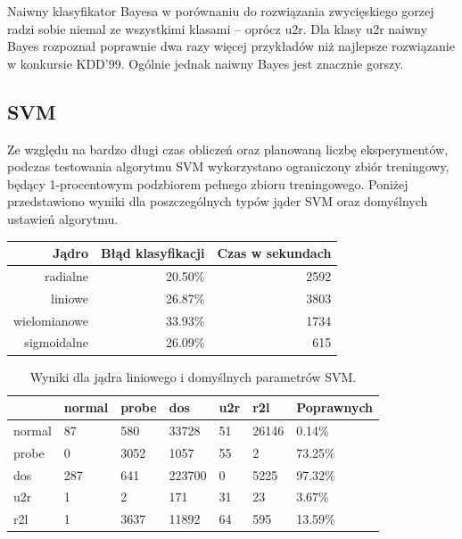 \documentclass[a4paper, 12pt]{article}
\begin{document}
Naiwny klasyfikator Bayesa w porównaniu do rozwiązania zwycięskiego gorzej radzi sobie
niemal ze wszystkimi klasami -- oprócz u2r. Dla klasy u2r naiwny Bayes rozpoznał poprawnie
dwa razy więcej przykładów niż najlepsze rozwiązanie w konkursie KDD'99. 
Ogólnie jednak naiwny Bayes jest znacznie gorszy.

\subsection{SVM}

Ze względu na bardzo długi czas obliczeń oraz planowaną liczbę eksperymentów, podczas testowania algorytmu SVM wykorzystano ograniczony zbiór treningowy, będący 1-procentowym
podzbiorem pełnego zbioru treningowego. Poniżej przedstawiono wyniki dla poszczególnych typów jąder SVM oraz domyślnych ustawień algorytmu.

\begin{table}[H]
\centering
\begin{tabular}{ | r | r | r | } \hline
Jądro & Błąd klasyfikacji & Czas w sekundach \\ \hline
radialne & 20.50\% & 2592 \\ \hline
liniowe & 26.87\% & 3803 \\ \hline
wielomianowe & 33.93\% & 1734 \\ \hline
sigmoidalne & 26.09\% & 615 \\ \hline
\end{tabular} 
\end{table}

\begin{table}[H]
\centering
\begin{tabular}{ | l | l | l | l | l | l | l | } \hline
	& normal &  probe &   dos  &  u2r  & r2l 	& Poprawnych	\\ \hline
 normal  &   87 &  580 & 33728 & 51 & 26146 & 0.14\% \\ \hline
 probe   &    0 &  3052 &  1057 & 55  &   2 & 73.25\% \\ \hline
 dos     &  287 &  641  & 223700 &  0 & 5225 & 97.32\% \\ \hline
 u2r     &    1 &   2   &  171 & 31 &  23 & 3.67\% \\ \hline
 r2l     &   1  & 3637  &  11892 & 64 & 595 & 13.59\% \\ \hline
\end{tabular}
\caption{Wyniki dla jądra liniowego i domyślnych parametrów SVM.}
\label{table:cm_svm_linear_default}
\end{table}
\end{document}
